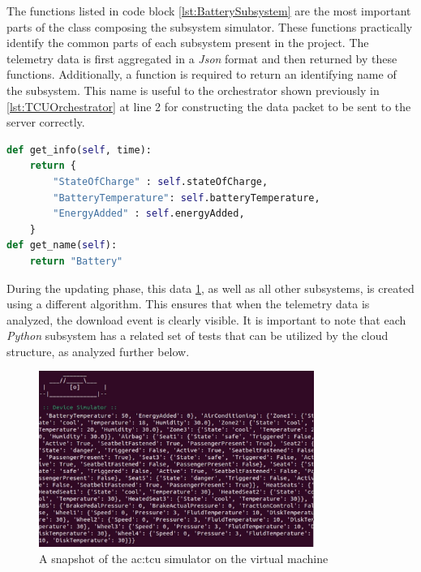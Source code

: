 The functions listed in code block \ref{lst:BatterySubsystem} are the most important parts of the class composing the subsystem simulator. These functions practically identify the common parts of each subsystem present in the project. The telemetry data is first aggregated in a \textit{Json} format and then returned by these functions. Additionally, a function is required to return an identifying name of the subsystem. This name is useful to the orchestrator shown previously in \ref{lst:TCUOrchestrator} at line 2 for constructing the data packet to be sent to the server correctly.
\begin{lstlisting}[language=Python, caption={Battery subsystem return code}, label=lst:BatterySubsystem]
def get_info(self, time):
    return {
        "StateOfCharge" : self.stateOfCharge,
        "BatteryTemperature": self.batteryTemperature,
        "EnergyAdded" : self.energyAdded,
    }
def get_name(self):
    return "Battery"  
\end{lstlisting}
During the updating phase, this data \ref{fig:TCUsimulatorP}, as well as all other subsystems, is created using a different algorithm. This ensures that when the telemetry data is analyzed, the download event is clearly visible. It is important to note that each \textit{Python} subsystem has a related set of tests that can be utilized by the cloud structure, as analyzed further below.
\begin{figure}[h]  %
    \centering
    \includegraphics[width=0.8\textwidth]{images/TCUsimulatorP.png}  %
    \caption{A snapshot of the \gls{ac:tcu} simulator on the virtual machine}
    \label{fig:TCUsimulatorP}
\end{figure}

